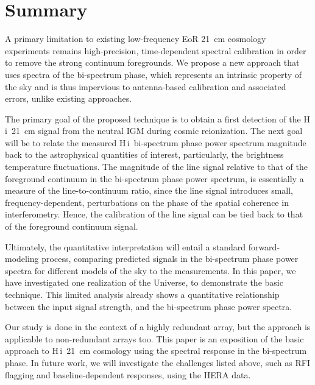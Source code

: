 \documentclass[
reprint,
superscriptaddress,
amsmath,
amssymb,
aps,
prd
]{revtex4-1}
\newcommand{\HI}{H\,{\sc i}}
\begin{document}
\section{Summary}\label{sec:summary}

A primary limitation to existing low-frequency EoR 21~cm cosmology experiments remains high-precision, time-dependent spectral calibration in order to remove the strong continuum foregrounds. We propose a new approach that uses spectra of the bi-spectrum phase, which represents an intrinsic property of the sky and is thus impervious to antenna-based calibration and associated errors, unlike existing approaches.
  
The primary goal of the proposed technique is to obtain a first detection of the \HI\ 21~cm signal from the neutral IGM during cosmic reionization. The next goal will be to relate the measured \HI\ bi-spectrum phase power spectrum magnitude back to the astrophysical quantities of interest, particularly, the brightness temperature fluctuations. The magnitude of the line signal relative to that of the foreground continuum in the bi-spectrum phase power spectrum, is essentially a measure of the line-to-continuum ratio, since the line signal introduces small, frequency-dependent, perturbations on the phase of the spatial coherence in interferometry. Hence, the calibration of the line signal can be tied back to that of the foreground continuum signal.

Ultimately, the quantitative interpretation will entail a standard forward-modeling process, comparing predicted signals in the bi-spectrum phase power spectra for different models of the sky to the measurements. In this paper, we have investigated one realization of the Universe, to demonstrate the basic technique. This limited analysis already shows a quantitative relationship between the input signal strength, and the bi-spectrum phase power spectra.

Our study is done in the context of a highly redundant array, but the approach is applicable to non-redundant arrays too. This paper is an exposition of the basic approach to \HI\ 21~cm cosmology using the spectral response in the bi-spectrum phase. In future work, we will investigate the challenges listed above, such as RFI flagging and baseline-dependent responses, using the HERA data.

\end{document}
